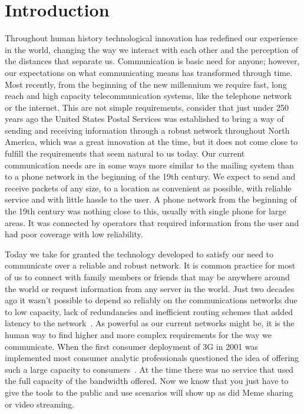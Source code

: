 \setcounter{equation}{0}
\chapter{Introduction}
  Throughout human history technological innovation has redefined our experience in the world, changing the way we interact with each other and the perception of the distances that separate us. Communication is basic need for anyone; however, our expectations on what communicating means has transformed through time. Most recently, from the beginning of the new millennium we require fast, long reach and high capacity telecommunication systems, like  the telephone network or the internet. This are not simple requirements, consider that just under 250 years ago the United States Postal Services was established to bring a way of sending and receiving information through a robust network throughout North America, which was a great innovation at the time, but it does not come close to fulfill the requirements that seem natural to us today. Our current communication needs are in some ways more similar to the mailing system than to a phone network in the beginning of the 19th century. We expect to send and receive packets of any size, to a location as convenient as possible, with reliable service and with little hassle to the user. A phone network from the beginning of the 19th century was nothing close to this, usually with single phone for large areas. It was connected by operators that required information from the user and had poor coverage with low reliability.

Today we take for granted the technology developed to satisfy our need to communicate over a reliable and robust network.  It is common practice for most of us to connect with family members or friends that may be anywhere around the world or request information from any server in the world. Just two decades ago it wasn't possible to depend so reliably on the communications networks due to low capacity, lack of redundancies and inefficient routing schemes that added latency to the network~\cite{HistoryCommunication}. As powerful as our current networks might be, it is the human way to find higher and more complex requirements for the way we communicate. When the first consumer deployment of 3G in 2001 was implemented most consumer analytic professionals questioned the idea of offering such a large capacity to consumers~\cite{HistoryCommunication}. At the time there was no service that used the full capacity of the bandwidth offered. Now we know that you just have to give the tools to the public and use scenarios will show up as did Meme sharing or video streaming. 
        

